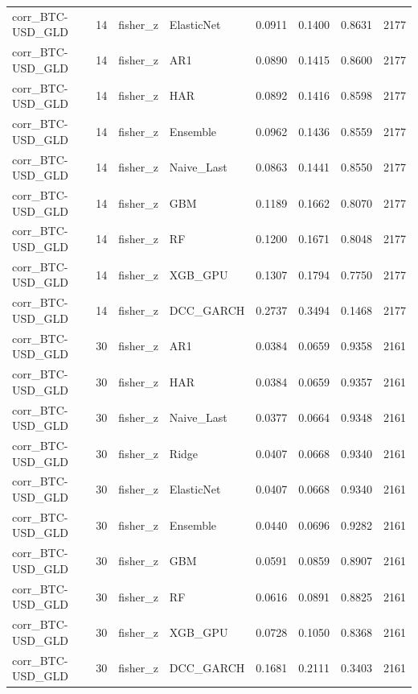 \begin{table}[H]
\begin{tabular}{llllrrrr}
corr_BTC-USD_GLD & 14 & fisher_z & ElasticNet & 0.0911 & 0.1400 & 0.8631 & 2177 \\
corr_BTC-USD_GLD & 14 & fisher_z & AR1 & 0.0890 & 0.1415 & 0.8600 & 2177 \\
corr_BTC-USD_GLD & 14 & fisher_z & HAR & 0.0892 & 0.1416 & 0.8598 & 2177 \\
corr_BTC-USD_GLD & 14 & fisher_z & Ensemble & 0.0962 & 0.1436 & 0.8559 & 2177 \\
corr_BTC-USD_GLD & 14 & fisher_z & Naive_Last & 0.0863 & 0.1441 & 0.8550 & 2177 \\
corr_BTC-USD_GLD & 14 & fisher_z & GBM & 0.1189 & 0.1662 & 0.8070 & 2177 \\
corr_BTC-USD_GLD & 14 & fisher_z & RF & 0.1200 & 0.1671 & 0.8048 & 2177 \\
corr_BTC-USD_GLD & 14 & fisher_z & XGB_GPU & 0.1307 & 0.1794 & 0.7750 & 2177 \\
corr_BTC-USD_GLD & 14 & fisher_z & DCC_GARCH & 0.2737 & 0.3494 & 0.1468 & 2177 \\
corr_BTC-USD_GLD & 30 & fisher_z & AR1 & 0.0384 & 0.0659 & 0.9358 & 2161 \\
corr_BTC-USD_GLD & 30 & fisher_z & HAR & 0.0384 & 0.0659 & 0.9357 & 2161 \\
corr_BTC-USD_GLD & 30 & fisher_z & Naive_Last & 0.0377 & 0.0664 & 0.9348 & 2161 \\
corr_BTC-USD_GLD & 30 & fisher_z & Ridge & 0.0407 & 0.0668 & 0.9340 & 2161 \\
corr_BTC-USD_GLD & 30 & fisher_z & ElasticNet & 0.0407 & 0.0668 & 0.9340 & 2161 \\
corr_BTC-USD_GLD & 30 & fisher_z & Ensemble & 0.0440 & 0.0696 & 0.9282 & 2161 \\
corr_BTC-USD_GLD & 30 & fisher_z & GBM & 0.0591 & 0.0859 & 0.8907 & 2161 \\
corr_BTC-USD_GLD & 30 & fisher_z & RF & 0.0616 & 0.0891 & 0.8825 & 2161 \\
corr_BTC-USD_GLD & 30 & fisher_z & XGB_GPU & 0.0728 & 0.1050 & 0.8368 & 2161 \\
corr_BTC-USD_GLD & 30 & fisher_z & DCC_GARCH & 0.1681 & 0.2111 & 0.3403 & 2161 \\
\bottomrule
\end{tabular}
\end{table}